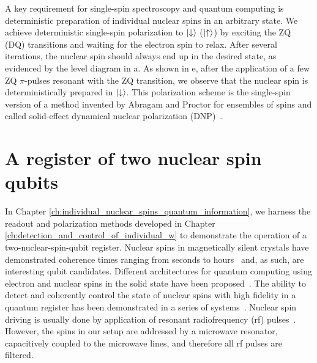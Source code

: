 A key requirement for single-spin spectroscopy and quantum computing is deterministic preparation of individual nuclear spins in an arbitrary state. We achieve deterministic single-spin polarization to $\ket{\downarrow}$ ($\ket{\uparrow}$) by exciting the ZQ (DQ) transitions and waiting for the electron spin to relax. After several iterations, the nuclear spin should always end up in the desired state, as evidenced by the level diagram in a. As shown in e, after the application of a few ZQ $\pi$-pulses resonant with the ZQ transition, we observe that the \W nuclear spin is deterministically prepared in $\ket{\downarrow}$. This polarization scheme is the single-spin version of a method invented by Abragam and Proctor for ensembles of spins and called solid-effect dynamical nuclear polarization (DNP)~.


\section{A register of two nuclear spin qubits}



In Chapter \ref{ch:individual_nuclear_spins_quantum_information}, we harness the readout and polarization methods developed in Chapter \ref{ch:detection_and_control_of_individual_w} to demonstrate the operation of a two-nuclear-spin-qubit register. Nuclear spins in magnetically silent crystals have demonstrated coherence times ranging from seconds to hours~ and, as such, are interesting qubit candidates. Different architectures for quantum computing using electron and nuclear spins in the solid state have been proposed~\cite{dutt_quantum_2007b,awschalom_quantum_2018,zwanenburg_silicon_2013}. The ability to detect and coherently control the state of nuclear spins with high fidelity in a quantum register has been demonstrated in a series of systems~. Nuclear spin driving is usually done by application of resonant radiofrequency (rf) pulses~. However, the \Er spins in our setup are addressed by a microwave resonator, capacitively coupled to the microwave lines, and therefore all rf pulses are filtered.


